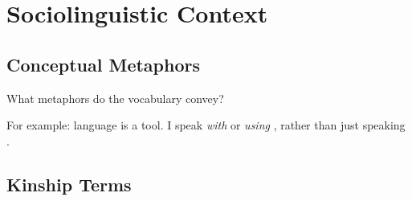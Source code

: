 \chapter{Sociolinguistic Context}
\label{app:tvk-sociolinguistic-context}

\section{Conceptual Metaphors}
\label{sec:tvk-conceptual-metaphors}

What metaphors do the vocabulary convey?

For example: language is a tool. I speak \textit{with} or \textit{using} \langtvk, rather than just speaking \langtvk.

\section{Kinship Terms}
\label{sec:tvk-kinship-terms}

